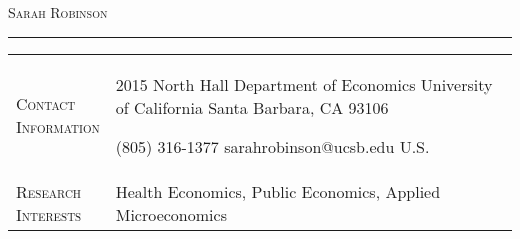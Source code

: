 \documentclass[11pt]{article}
\begin{document}
\begin{center}

{\Huge\textsc{Sarah Robinson}} \\[5pt]



\end{center}

\vspace{-6pt}

\noindent\rule{\textwidth}{1pt}

\vspace{6pt}

\begin{tabularx}{\textwidth}{@{}Y Z@{}}
	
	
	\textsc{Contact \newline Information} & 
	\begin{minipage}[t]{0.35\textwidth}
		2015 North Hall \newline
		Department of Economics \newline
		University of California \newline
		Santa Barbara, CA 93106
	\end{minipage}\begin{minipage}[t]{0.4\textwidth}
	 (805) 316-1377 \newline
	 sarahrobinson@ucsb.edu \newline
	 \href{https://www.s-robinson.com}{\color{blue}{www.s-robinson.com}} \newline
	 U.S.
\end{minipage}
	\newline \\[15pt]
	
	\textsc{Research \newline Interests} \vspace{20pt} & 
	Health Economics, Public Economics, Applied Microeconomics
	\\[15pt]
	

\end{tabularx}
\end{document}
